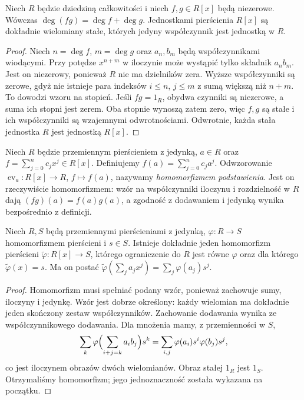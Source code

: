 \begin{lemat}
\label{aa:lem:poly-degree}
Niech $R$ będzie dziedziną całkowitości i niech
$f,g\in R[x]$ będą niezerowe. Wówczas
$\deg(fg)=\deg f+\deg g$. Jednostkami pierścienia $R[x]$
są dokładnie wielomiany stałe, których jedyny współczynnik
jest jednostką w $R$.
\end{lemat}
\begin{proof}
Niech $n=\deg f$, $m=\deg g$ oraz $a_n,b_m$ będą
współczynnikami wiodącymi. Przy potędze $x^{n+m}$ w iloczynie
może wystąpić tylko składnik $a_nb_m$. Jest on niezerowy,
ponieważ $R$ nie ma dzielników zera. Wyższe współczynniki są
zerowe, gdyż nie istnieje para indeksów $i\le n$, $j\le m$
z sumą większą niż $n+m$. To dowodzi wzoru na stopień.
Jeśli $fg=1_R$, obydwa czynniki są niezerowe, a suma
ich stopni jest zerem. Oba stopnie wynoszą zatem zero,
więc $f,g$ są stałe i ich współczynniki są wzajemnymi
odwrotnościami. Odwrotnie, każda stała jednostka $R$
jest jednostką $R[x]$.
\end{proof}

\begin{definicja}
\label{aa:def:poly-evaluation}
Niech $R$ będzie przemiennym pierścieniem z jedynką,
$a\in R$ oraz $f=\sum_{j=0}^n c_jx^j\in R[x]$.
Definiujemy
$f(a)=\sum_{j=0}^n c_ja^j$. Odwzorowanie
$\operatorname{ev}_a:R[x]\to R$, $f\mapsto f(a)$,
nazywamy \emph{homomorfizmem podstawienia}.
Jest on rzeczywiście homomorfizmem: wzór na współczynniki
iloczynu i rozdzielność w $R$ dają
$(fg)(a)=f(a)g(a)$, a zgodność z dodawaniem i jedynką
wynika bezpośrednio z definicji.
\end{definicja}
\begin{lemat}
\label{aa:lem:poly-universal}
Niech $R,S$ będą przemiennymi pierścieniami z jedynką,
$\varphi:R\to S$ homomorfizmem pierścieni i $s\in S$.
Istnieje dokładnie jeden homomorfizm pierścieni
$\widetilde\varphi:R[x]\to S$, którego ograniczenie
do $R$ jest równe $\varphi$ oraz dla którego
$\widetilde\varphi(x)=s$. Ma on postać
$\widetilde\varphi(\sum_j a_jx^j)=\sum_j\varphi(a_j)s^j$.
\end{lemat}
\begin{proof}
Homomorfizm musi spełniać podany wzór, ponieważ zachowuje
sumy, iloczyny i jedynkę. Wzór jest dobrze określony:
każdy wielomian ma dokładnie jeden skończony zestaw współczynników.
Zachowanie dodawania wynika ze współczynnikowego dodawania.
Dla mnożenia mamy, z przemienności w $S$,
\[
 \sum_k\varphi\Bigl(\sum_{i+j=k}a_i b_j\Bigr)s^k
 =\sum_{i,j}\varphi(a_i)s^i\varphi(b_j)s^j,
\]
co jest iloczynem obrazów dwóch wielomianów.
Obraz stałej $1_R$ jest $1_S$. Otrzymaliśmy homomorfizm;
jego jednoznaczność została wykazana na początku.
\end{proof}


